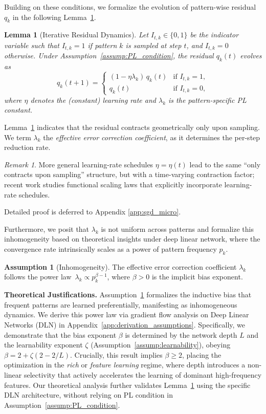 \documentclass{article}
\theoremstyle{plain}
\newtheorem{lemma}[theorem]{Lemma}
\theoremstyle{definition}
\newtheorem{assumption}[theorem]{Assumption}
\theoremstyle{remark}
\newtheorem{remark}[theorem]{Remark}
\begin{document}
Building on these conditions, we formalize the evolution of pattern-wise residual $q_k$ in the following Lemma~\ref{lemma:q_dynamic}.
\begin{lemma}[Iterative Residual Dynamics]
    \label{lemma:q_dynamic}
    Let $I_{t,k} \in \{0, 1\}$ be the indicator variable such that $I_{t,k}=1$ if pattern $k$ is sampled at step $t$, and $I_{t,k}=0$ otherwise. Under Assumption~\ref{assump:PL_condition}, the residual $q_k(t)$ evolves as
    \[
    q_k(t+1) = \begin{cases} (1-\eta \lambda_k)\,q_k(t) & \text{if } I_{t,k}=1, \\ q_k(t) & \text{if } I_{t,k}=0, \end{cases}
    \]
    where $\eta$ denotes the (constant) learning rate and $\lambda_k$ is the pattern-specific PL constant.
\end{lemma}
Lemma~\ref{lemma:q_dynamic} indicates that the residual contracts geometrically only upon sampling.
We term $\lambda_k$ the \textit{effective error correction coefficient}, as it determines the per-step reduction rate.

\begin{remark}
More general learning-rate schedules $\eta=\eta(t)$ lead to the same “only contracts upon sampling” structure, but with a time-varying contraction factor; recent work studies functional scaling laws that explicitly incorporate learning-rate schedules. \citep{li2025functionalscalinglawskernel}
\end{remark}

Detailed proof is deferred to Appendix \ref{app:sgd_micro}.


Furthermore, we posit that $\lambda_k$ is not uniform across patterns and formalize this inhomogeneity based on theoretical insights under deep linear network, where the convergence rate intrinsically scales as a power of pattern frequency $p_k$.
\begin{assumption}[Inhomogeneity]
    \label{assump:spectral_power}
    The effective error correction coefficient $\lambda_k$ follows the power law~$\lambda_k \propto p_k^{\beta-1}$, where $\beta>0$ is the implicit bias exponent.
\end{assumption}
\textbf{Theoretical Justifications.}\quad
Assumption~\ref{assump:spectral_power} formalizes the inductive bias that frequent patterns are learned preferentially, manifesting as inhomogeneous dynamics. 
We derive this power law via gradient flow analysis on Deep Linear Networks (DLN) in Appendix~\ref{app:derivation_assumptions}. Specifically, we demonstrate that the bias exponent $\beta$ is determined by the network depth $L$ and the learnability exponent $\zeta$ (Assumption~\ref{assump:learnability}), obeying $\beta = 2 + \zeta(2 - 2/L)$.
Crucially, this result implies $\beta \ge 2$, placing the optimization in the \textit{rich} or \textit{feature learning} regime, where depth introduces a non-linear selectivity that actively accelerates the learning of dominant high-frequency features.
Our theoretical analysis further validates Lemma~\ref{lemma:q_dynamic} using the specific DLN architecture, without relying on PL condition in Assumption~\ref{assump:PL_condition}.
\end{document}

